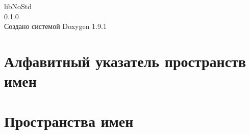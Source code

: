 \let\mypdfximage\pdfximage\def\pdfximage{\immediate\mypdfximage}\documentclass[twoside]{book}
\newcommand{\+}{\discretionary{\mbox{\scriptsize$\hookleftarrow$}}{}{}}
\newcommand{\clearemptydoublepage}{%
  \newpage{\pagestyle{empty}\cleardoublepage}%
}
\begin{document}
\raggedbottom

\hypersetup{pageanchor=false,
             bookmarksnumbered=true,
             pdfencoding=unicode
            }
\begin{titlepage}
\vspace*{7cm}
\begin{center}%
{\Large lib\+No\+Std \\[1ex]\large 0.\+1.\+0 }\\
\vspace*{1cm}
{\large Создано системой Doxygen 1.9.1}\\
\end{center}
\end{titlepage}
\clearemptydoublepage
{}
\tableofcontents
\clearemptydoublepage
{}
\hypersetup{pageanchor=true}

\chapter{Алфавитный указатель пространств имен}

\chapter{Пространства имен}


\backmatter
\newpage
{}
\clearemptydoublepage
{}
\printindex
\end{document}
